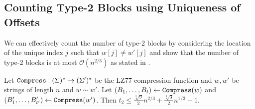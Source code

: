 


\subsection{Counting Type-2 Blocks using Uniqueness of Offsets}

We can effectively count the number of type-2 blocks by considering the location of the unique index $j$ such that $w[j]\neq w'[j]$ and show that the number of type-2 blocks is at most $\mathcal{O}(n^{2/3})$ as stated in . 

\newcommand{\lemblocknumstatement}{
Let $\compress:(\Sigma)^*\rightarrow(\Sigma')^*$ be the LZ77 compression function and $w,w'$ be strings of length $n$ and $w\sim w'$. Let $(B_1,\ldots,B_t)\gets\compress(w)$ and $(B_1',\ldots,B_{t'}')\gets\compress(w')$. Then $t_2\leq \frac{\sqrt[3]{9}}{2} n^{2/3} + \frac{\sqrt[3]{3}}{2} n^{1/3} + 1$.
}
\begin{lemma}
    \lemblocknumstatement
\end{lemma}

